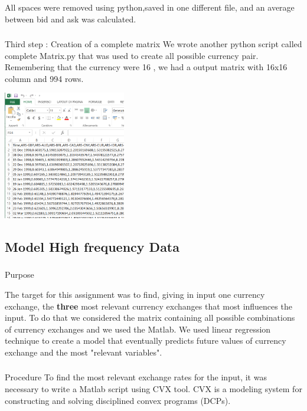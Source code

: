 All spaces were removed using python,saved in one different file, and an average between bid and ask was calculated.
\newline
\subsubsection{}{Third step : Creation of a complete matrix }
\newline
We wrote another python script called complete Matrix.py that was used to create all possible currency pair. Remembering that the currency were 16 , we had a output matrix with 16x16 column and 994 rows.

\includegraphics[width=0.4\textwidth]{bbb.png}
\subsection{Model High frequency Data}

\subsubsection{}{Purpose}

The target for this assignment was to find, giving in input one currency exchange, the \textbf{three} most relevant currency exchanges that most influences the input. To do that we considered the matrix containing all possible combinations of currency exchanges and we used the Matlab. We used linear regression technique to create a model that eventually predicts future values of currency exchange  and the most "relevant variables".

\subsubsection{}{Procedure}
To find the most relevant exchange rates for the input, it was necessary to write a Matlab script using CVX tool. CVX is a modeling system for constructing and solving disciplined convex programs (DCPs)\cite{leung2000forecasting}. 

